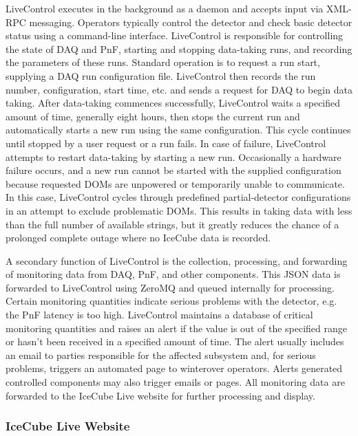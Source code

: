 LiveControl executes in the background as a daemon and accepts input
via XML-RPC messaging.  Operators typically control the detector and check basic
detector status using a command-line interface.  LiveControl is responsible
for controlling the state of DAQ and PnF, starting and
stopping data-taking runs, and recording the parameters of these runs.
Standard operation is to request a run start, supplying a DAQ run configuration
file.  LiveControl then records the run number, configuration, start time,
etc. and sends a request 
for DAQ to begin data taking.  After data-taking commences successfully,
LiveControl waits a specified amount of time, generally eight hours, then
stops the current run and automatically starts a new run using the same
configuration.  This cycle continues until stopped by a user request or a
run fails.  In case of failure, LiveControl attempts to restart data-taking
by starting a new run.  Occasionally a hardware failure occurs, and a new
run cannot be started with the supplied configuration because requested
DOMs are unpowered or temporarily unable to communicate.  In this case,
LiveControl cycles through predefined partial-detector 
configurations in an attempt to exclude problematic DOMs.  This results in
taking data with less than the full number of available strings, but it
greatly reduces the chance of a prolonged complete outage where no IceCube
data is recorded.

A secondary function of LiveControl is the collection, processing, and
forwarding of monitoring data from DAQ, PnF, and other
components.  This JSON data is forwarded to LiveControl using ZeroMQ and queued internally
for processing.  Certain monitoring quantities indicate serious problems with
the detector, e.g. the PnF latency is too high.  LiveControl
maintains a database of critical monitoring quantities and raises an alert
if the value is out of the specified range or 
hasn't been received in a specified amount of time.  The alert usually
includes an email to parties responsible for the affected subsystem and,
for serious problems, triggers an automated page to winterover operators.
Alerts generated controlled components may also trigger emails or pages.
All monitoring data are forwarded to the IceCube Live website for further
processing and display. 

\subsubsection{IceCube Live Website}

